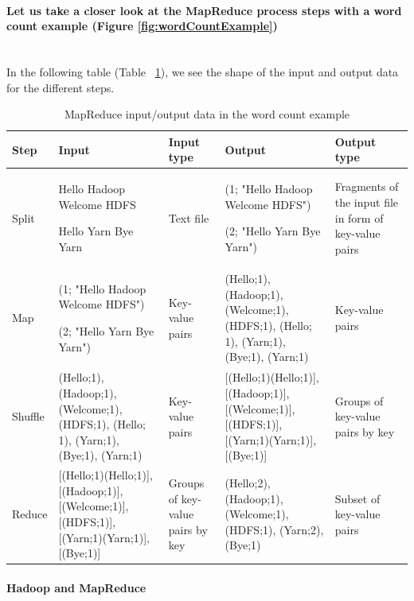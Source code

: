 \documentclass[12pt,english]{book}
\begin{document}
\paragraph{Let us take a closer look at the MapReduce process steps with a word count example (Figure \ref{fig:wordCountExample})}\mbox{}\\


In the following table (Table ~\ref{tbl:wordCountExample}), we see the shape of the input and output data for the different steps.

\begin{table}[H]
\begin{tabular}{|p{1.4cm}|p{3.4cm}|p{1.5cm}|p{3.3cm}|p{2cm}|}
\hline
\rowcolor[HTML]{CBCEFB} 
Step & Input & Input type & Output & Output type
\\ \hline
Split &
Hello Hadoop Welcome HDFS \par Hello Yarn Bye Yarn &
Text file &
(1; "Hello Hadoop Welcome HDFS") \par (2; "Hello Yarn Bye Yarn") &
Fragments of the input file in form of key-value pairs
\\ \hline
\rowcolor[HTML]{EDEDED}
Map & 
(1; "Hello Hadoop Welcome HDFS") \par (2; "Hello Yarn Bye Yarn") &
Key-value pairs &
(Hello;1), (Hadoop;1), (Welcome;1), (HDFS;1), (Hello; 1), (Yarn;1), (Bye;1), (Yarn;1) &
Key-value pairs
\\ \hline
Shuffle &
(Hello;1), (Hadoop;1), (Welcome;1), (HDFS;1), (Hello; 1), (Yarn;1), (Bye;1), (Yarn;1) &
Key-value pairs &
[(Hello;1)(Hello;1)], [(Hadoop;1)], [(Welcome;1)], [(HDFS;1)], [(Yarn;1)(Yarn;1)], [(Bye;1)] &
Groups of key-value pairs by key
\\ \hline
\rowcolor[HTML]{EDEDED}
Reduce & 
[(Hello;1)(Hello;1)], [(Hadoop;1)], [(Welcome;1)], [(HDFS;1)], [(Yarn;1)(Yarn;1)], [(Bye;1)] &
Groups of key-value pairs by key & 
(Hello;2), (Hadoop;1), (Welcome;1), (HDFS;1), (Yarn;2), (Bye;1) &
Subset of key-value pairs 
\\ \hline
\end{tabular}
\caption{MapReduce input/output data in the word count example}
\label{tbl:wordCountExample}
\end{table}


\paragraph{Hadoop and MapReduce}\mbox{}\\
\end{document}
